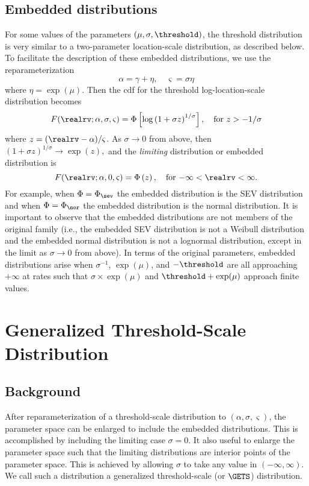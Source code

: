 \subsection{Embedded distributions}
\label{section:embedded.models}
For some values of the parameters $(\mu, \sigma,\threshold)$, the
threshold distribution is very similar to a two-parameter
location-scale distribution, as described below. To facilitate the
description of these embedded distributions, we use the
reparameterization
\begin{displaymath}
\alpha =\gamma+\eta, \quad \varsigma=\sigma \eta
\end{displaymath}
where $\eta=\exp(\mu)$. Then the cdf for the threshold 
log-location-scale distribution becomes
\begin{displaymath}
F(\realrv;\alpha, \sigma,\varsigma)=
\Phi
\left [
\log \left ( 1+ \sigma z
           \right )^{1/\sigma}
\right ], \quad \mbox{for $z> -1/\sigma$}	
\end{displaymath}
where $z=(\realrv-\alpha)/\varsigma$. As $\sigma \to 0$ from above,
then
$
\left ( 1+ \sigma z
           \right )^{1/\sigma}
\to 
\exp(z),
$
and the {\em limiting} distribution
or embedded distribution is
\begin{displaymath}
F(\realrv;\alpha, 0,\varsigma)=
\Phi
\left (
 z \right ), \quad \mbox{for $-\infty<\realrv<\infty$}.
\end{displaymath} For example, when $\Phi=\Phi_{\sev}$ the embedded
distribution is the SEV distribution and when $\Phi=\Phi_{\nor}$ the
embedded distribution is the normal distribution. It is important to
observe that the embedded distributions are not members of the
original family (i.e., the embedded SEV distribution is not a Weibull
distribution and the embedded normal distribution is not a lognormal
distribution, except in the limit as $\sigma \to 0$ from above).  In
terms of the original parameters, embedded distributions arise when
$\sigma^{-1}$, $\exp(\mu)$, and $-\threshold$ are all approaching
$+\infty$ at rates such that $\sigma \times \exp(\mu)$ and
$\threshold+\exp(\mu)$ approach finite values.


\section{Generalized Threshold-Scale Distribution}
\label{section:gets.dist}
\subsection{Background} 
After reparameterization of a threshold-scale distribution to
$(\alpha,
\sigma,\varsigma)$, the parameter space can be enlarged to include the
embedded distributions.  This is accomplished by including the
limiting case $\sigma=0$.  It also useful to enlarge the parameter
space such that the limiting distributions are interior points of the
parameter space.  This is achieved by allowing $\sigma$ to take any
value in $(-\infty, \infty)$.  We call such a distribution a
generalized threshold-scale (or $\GETS$) distribution.

